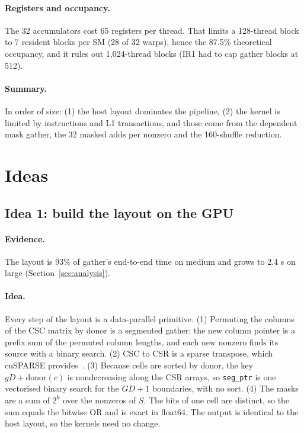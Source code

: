 \documentclass[sigconf,nonacm]{acmart}
\newcommand{\code}[1]{\texttt{#1}}
\begin{document}
\paragraph{Registers and occupancy.} The 32 accumulators cost 65 registers per thread. That limits a
128-thread block to 7 resident blocks per SM (28 of 32 warps), hence the 87.5\% theoretical
occupancy, and it rules out 1,024-thread blocks (IR1 had to cap gather blocks at 512).

\paragraph{Summary.} In order of size: (1) the host layout dominates the pipeline, (2) the kernel is
limited by instructions and L1 transactions, and those come from the dependent mask gather, the 32
masked adds per nonzero and the 160-shuffle reduction.

\section{Ideas}
\label{sec:ideas}

\subsection{Idea 1: build the layout on the GPU}

\paragraph{Evidence.} The layout is 93\% of gather's end-to-end time on medium and grows to 2.4 s on
large (Section~\ref{sec:analysis}).

\paragraph{Idea.} Every step of the layout is a data-parallel primitive. (1) Permuting the columns of
the CSC matrix by donor is a segmented gather: the new column pointer is a prefix sum of the permuted
column lengths, and each new nonzero finds its source with a binary search. (2) CSC to CSR is a sparse
transpose, which cuSPARSE provides~\cite{cusparse}. (3) Because cells are sorted by donor, the key
$gD + \mathrm{donor}(c)$ is nondecreasing along the CSR arrays, so \code{seg\_ptr} is one vectorised
binary search for the $GD+1$ boundaries, with no sort. (4) The masks are a sum of $2^k$ over the
nonzeros of $S$. The bits of one cell are distinct, so the sum equals the bitwise OR and is exact in
float64. The output is identical to the host layout, so the kernels need no change.
\end{document}
